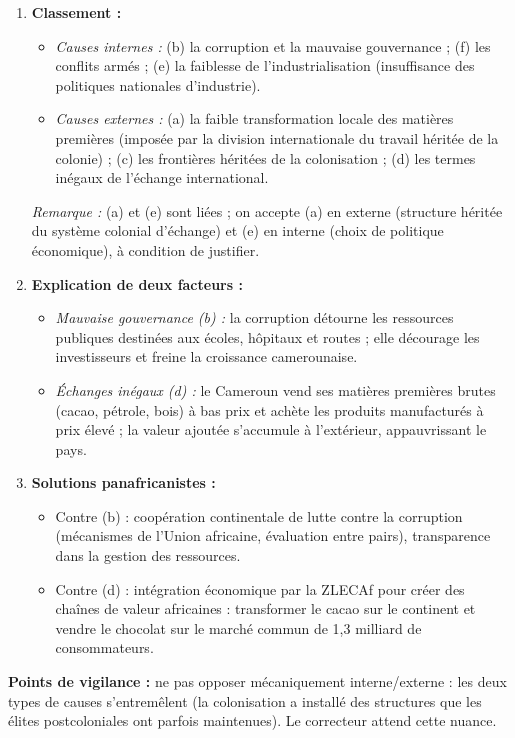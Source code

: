 \documentclass[11pt]{article}
\begin{document}
\begin{corrige}
\begin{enumerate}
\item \textbf{Classement :}
\begin{itemize}
\item \emph{Causes internes :} (b) la corruption et la mauvaise gouvernance ; (f) les conflits armés ; (e) la faiblesse de l'industrialisation (insuffisance des politiques nationales d'industrie).
\item \emph{Causes externes :} (a) la faible transformation locale des matières premières (imposée par la division internationale du travail héritée de la colonie) ; (c) les frontières héritées de la colonisation ; (d) les termes inégaux de l'échange international.
\end{itemize}
\emph{Remarque :} (a) et (e) sont liées ; on accepte (a) en externe (structure héritée du système colonial d'échange) et (e) en interne (choix de politique économique), à condition de justifier.
\item \textbf{Explication de deux facteurs :}
\begin{itemize}
\item \emph{Mauvaise gouvernance (b) :} la corruption détourne les ressources publiques destinées aux écoles, hôpitaux et routes ; elle décourage les investisseurs et freine la croissance camerounaise.
\item \emph{Échanges inégaux (d) :} le Cameroun vend ses matières premières brutes (cacao, pétrole, bois) à bas prix et achète les produits manufacturés à prix élevé ; la valeur ajoutée s'accumule à l'extérieur, appauvrissant le pays.
\end{itemize}
\item \textbf{Solutions panafricanistes :}
\begin{itemize}
\item Contre (b) : coopération continentale de lutte contre la corruption (mécanismes de l'Union africaine, évaluation entre pairs), transparence dans la gestion des ressources.
\item Contre (d) : intégration économique par la ZLECAf pour créer des chaînes de valeur africaines : transformer le cacao sur le continent et vendre le chocolat sur le marché commun de 1,3 milliard de consommateurs.
\end{itemize}
\end{enumerate}
\textbf{Points de vigilance :} ne pas opposer mécaniquement interne/externe : les deux types de causes s'entremêlent (la colonisation a installé des structures que les élites postcoloniales ont parfois maintenues). Le correcteur attend cette nuance.
\end{corrige}
\end{document}
